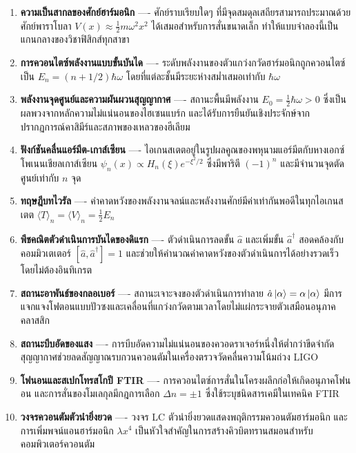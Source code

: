 \begin{enumerate}
    \item \textbf{ความเป็นสากลของศักย์ฮาร์มอนิก} ---- ศักย์ราบเรียบใดๆ ที่มีจุดสมดุลเสถียรสามารถประมาณด้วยศักย์พาราโบลา $V(x) \approx \frac{1}{2}m\omega^2 x^2$ ได้เสมอสำหรับการสั่นขนาดเล็ก ทำให้แบบจำลองนี้เป็นแกนกลางของวิชาฟิสิกส์ทุกสาขา
    
    \item \textbf{การควอนไตซ์พลังงานแบบขั้นบันได} ---- ระดับพลังงานของตัวแกว่งกวัดฮาร์มอนิกถูกควอนไตซ์เป็น $E_n = (n + 1/2)\hbar\omega$ โดยที่แต่ละชั้นมีระยะห่างสม่ำเสมอเท่ากับ $\hbar\omega$
    
    \item \textbf{พลังงานจุดศูนย์และความผันผวนสุญญากาศ} ---- สถานะพื้นมีพลังงาน $E_0 = \frac{1}{2}\hbar\omega > 0$ ซึ่งเป็นผลพวงจากหลักความไม่แน่นอนของไฮเซนแบร์ก และได้รับการยืนยันเชิงประจักษ์จากปรากฏการณ์คาสิมีร์และสภาพของเหลวของฮีเลียม
    
    \item \textbf{ฟังก์ชันคลื่นแอร์มีต-เกาส์เซียน} ---- ไอเกนสเตตอยู่ในรูปผลคูณของพหุนามแอร์มีตกับหางเอกซ์โพเนนเชียลเกาส์เซียน $\psi_n(x) \propto H_n(\xi)e^{-\xi^2/2}$ ซึ่งมีพาริตี $(-1)^n$ และมีจำนวนจุดตัดศูนย์เท่ากับ $n$ จุด
    
    \item \textbf{ทฤษฎีบทไวรัล} ---- ค่าคาดหวังของพลังงานจลน์และพลังงานศักย์มีค่าเท่ากันพอดีในทุกไอเกนสเตต $\langle T \rangle_n = \langle V \rangle_n = \frac{1}{2}E_n$
    
    \item \textbf{พีชคณิตตัวดำเนินการบันไดของดิแรก} ---- ตัวดำเนินการลดขั้น $\hat{a}$ และเพิ่มขั้น $\hat{a}^\dagger$ สอดคล้องกับคอมมิวเตเตอร์ $[\hat{a}, \hat{a}^\dagger] = 1$ และช่วยให้คำนวณค่าคาดหวังของตัวดำเนินการได้อย่างรวดเร็วโดยไม่ต้องอินทิเกรต
    
    \item \textbf{สถานะอาพันธ์ของกลอเบอร์} ---- สถานะเจาะจงของตัวดำเนินการทำลาย $\hat{a}\ket{\alpha} = \alpha\ket{\alpha}$ มีการแจกแจงโฟตอนแบบปัวซงและเคลื่อนที่แกว่งกวัดตามเวลาโดยไม่แผ่กระจายตัวเสมือนอนุภาคคลาสสิก
    
    \item \textbf{สถานะบีบอัดของแสง} ---- การบีบอัดความไม่แน่นอนของควอดราเจอร์หนึ่งให้ต่ำกว่าขีดจำกัดสุญญากาศช่วยลดสัญญาณรบกวนควอนตัมในเครื่องตรวจวัดคลื่นความโน้มถ่วง LIGO
    
    \item \textbf{โฟนอนและสเปกโทรสโกปี FTIR} ---- การควอนไตซ์การสั่นในโครงผลึกก่อให้เกิดอนุภาคโฟนอน และการสั่นของโมเลกุลมีกฎการเลือก $\Delta n = \pm 1$ ซึ่งใช้ระบุชนิดสารเคมีในเทคนิค FTIR
    
    \item \textbf{วงจรควอนตัมตัวนำยิ่งยวด} ---- วงจร LC ตัวนำยิ่งยวดแสดงพฤติกรรมควอนตัมฮาร์มอนิก และการเพิ่มพจน์แอนฮาร์มอนิก $\lambda x^4$ เป็นหัวใจสำคัญในการสร้างคิวบิตทรานสมอนสำหรับคอมพิวเตอร์ควอนตัม
\end{enumerate}

